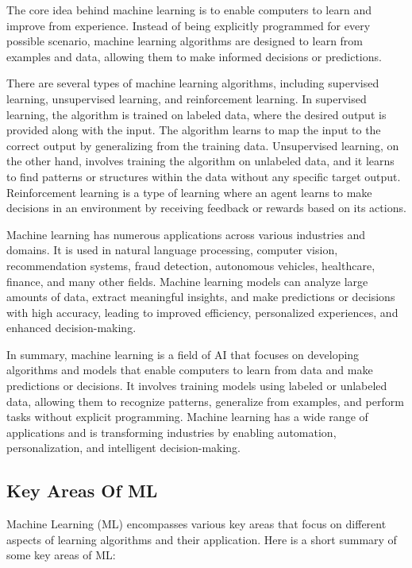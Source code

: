 The core idea behind machine learning is to enable computers to learn and improve from experience. Instead of being explicitly programmed for every possible scenario, machine learning algorithms are designed to learn from examples and data, allowing them to make informed decisions or predictions.

There are several types of machine learning algorithms, including supervised learning, unsupervised learning, and reinforcement learning. In supervised learning, the algorithm is trained on labeled data, where the desired output is provided along with the input. The algorithm learns to map the input to the correct output by generalizing from the training data. Unsupervised learning, on the other hand, involves training the algorithm on unlabeled data, and it learns to find patterns or structures within the data without any specific target output. Reinforcement learning is a type of learning where an agent learns to make decisions in an environment by receiving feedback or rewards based on its actions.

Machine learning has numerous applications across various industries and domains. It is used in natural language processing, computer vision, recommendation systems, fraud detection, autonomous vehicles, healthcare, finance, and many other fields. Machine learning models can analyze large amounts of data, extract meaningful insights, and make predictions or decisions with high accuracy, leading to improved efficiency, personalized experiences, and enhanced decision-making.

In summary, machine learning is a field of AI that focuses on developing algorithms and models that enable computers to learn from data and make predictions or decisions. It involves training models using labeled or unlabeled data, allowing them to recognize patterns, generalize from examples, and perform tasks without explicit programming. Machine learning has a wide range of applications and is transforming industries by enabling automation, personalization, and intelligent decision-making.


\subsection{Key Areas Of ML}

Machine Learning (ML) encompasses various key areas that focus on different aspects of learning algorithms and their application. Here is a short summary of some key areas of ML:


